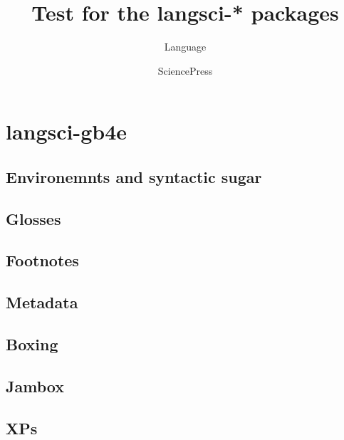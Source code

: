 \documentclass[output=book
	      ,nonflat
	      ,modfonts
	      ]{langsci/langscibook}
\title{Test for the langsci-* packages}
\author{Language\and Science\lastand Press}
\begin{document}
\maketitle
 
\section{langsci-gb4e}
\subsection{Environemnts and syntactic sugar}

% 







\writechapterpages
\subsection{Glosses}






\writechapterpages
\subsection{Footnotes}




\subsection{Metadata}

\subsection{Boxing}

% 
\subsection{Jambox}



\subsection{XPs}


  
\end{document}
